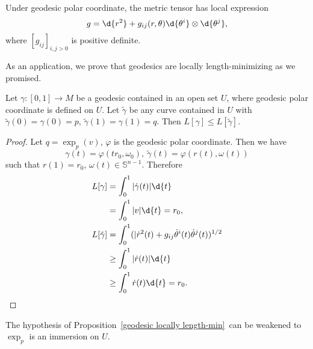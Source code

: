 \begin{cor}
    Under geodesic polar coordinate, the metric tensor has local expression
    \[g=\d{r^2}+g_{ij}(r,\theta)\d{\theta^i}\otimes\d{\theta^j},\]
    where $[g_{ij}]_{i,j>0}$ is positive definite.
\end{cor}

As an application, we prove that geodesics are locally length-minimizing as we promised.

\begin{prop}\label{geodesic locally length-min}
    Let $\gamma:[0,1]\to M$ be a geodesic contained in an open set $U$, where geodesic polar coordinate is defined on $U$.
    Let $\tilde\gamma$ be any curve contained in $U$ with $\tilde\gamma(0)=\gamma(0)=p$, $\tilde\gamma(1)=\gamma(1)=q$.
    Then $L[\gamma]\leq L[\tilde\gamma]$.
\end{prop}
\begin{proof}
    Let $q=\exp_p(v)$, $\varphi$ is the geodesic polar coordinate.
    Then we have
    \[\gamma(t)=\varphi(tr_0,\omega_0),\ \tilde\gamma(t)=\varphi(r(t),\omega(t))\]
    such that $r(1)=r_0$, $\omega(t)\in\mathbb{S}^{n-1}$.
    Therefore
    \begin{align*}
        L[\gamma]&=\int_0^1|\dot\gamma(t)|\d{t}\\
        &=\int_0^1|v|\d{t}=r_0,\\
        L[\tilde\gamma]&=\int_0^1(|\dot{r}^2(t)+g_{ij}\dot\theta^i(t)\dot\theta^j(t))^{1/2}\\
        &\geq\int_0^1|\dot{r}(t)|\d{t}\\
        &\geq\int_0^1\dot{r}(t)\d{t}=r_0.\qedhere
    \end{align*}
\end{proof}

\begin{rem}
    The hypothesis of Proposition~\ref{geodesic locally length-min}~can be weakened to $\exp_p$ is an immersion on $U$.
\end{rem}
